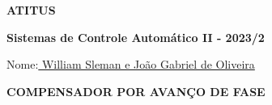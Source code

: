 \documentclass{control}
\begin{document}
\begin{center}
 \textbf{\LARGE{ATITUS}}
 
 \textbf{\Large{Sistemas de Controle Automático II - 2023/2}}\linebreak

\end{center}

\begin{flushleft}
Nome:\underline{ William Sleman e João Gabriel de Oliveira}  
\end{flushleft}

\begin{center}
\textcolor{myBlue}{\textbf{\LARGE{COMPENSADOR POR AVANÇO DE FASE}}}
\end{center}









 \newpage


\end{document}
